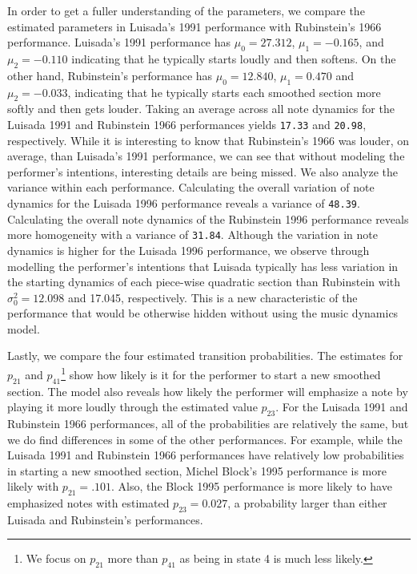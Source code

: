 \documentclass[12pt]{article}
\begin{document}
In order to get a fuller understanding of the parameters, we compare the
estimated parameters in Luisada's 1991 performance with Rubinstein's
1966 performance. Luisada's 1991 performance has \(\mu_0 = 27.312\),
\(\mu_1=-0.165\), and \(\mu_2=-0.110\) indicating that he typically
starts loudly and then softens. On the other hand, Rubinstein's
performance has \(\mu_0 = 12.840\), \(\mu_1=0.470\) and
\(\mu_2=-0.033\), indicating that he typically starts each smoothed
section more softly and then gets louder. Taking an average across all
note dynamics for the Luisada 1991 and Rubinstein 1966 performances
yields \texttt{17.33} and \texttt{20.98}, respectively. While it is
interesting to know that Rubinstein's 1966 was louder, on average, than
Luisada's 1991 performance, we can see that without modeling the
performer's intentions, interesting details are being missed. We also
analyze the variance within each performance. Calculating the overall
variation of note dynamics for the Luisada 1996 performance reveals a
variance of \texttt{48.39}. Calculating the overall note dynamics of the
Rubinstein 1996 performance reveals more homogeneity with a variance of
\texttt{31.84}. Although the variation in note dynamics is higher for
the Luisada 1996 performance, we observe through modelling the
performer's intentions that Luisada typically has less variation in the
starting dynamics of each piece-wise quadratic section than Rubinstein
with \(\sigma^2_0=12.098\) and 17.045, respectively. This is a new
characteristic of the performance that would be otherwise hidden without
using the music dynamics model.

Lastly, we compare the four estimated transition probabilities. The
estimates for \(p_{21}\) and
\(p_{41}\)\footnote{We focus on $p_{21}$ more than $p_{41}$ as being in state 4 is much less likely. }
show how likely is it for the performer to start a new smoothed section.
The model also reveals how likely the performer will emphasize a note by
playing it more loudly through the estimated value \(p_{23}\). For the
Luisada 1991 and Rubinstein 1966 performances, all of the probabilities
are relatively the same, but we do find differences in some of the other
performances. For example, while the Luisada 1991 and Rubinstein 1966
performances have relatively low probabilities in starting a new
smoothed section, Michel Block's 1995 performance is more likely with
\(p_{21}=.101\). Also, the Block 1995 performance is more likely to have
emphasized notes with estimated \(p_{23}=0.027\), a probability larger
than either Luisada and Rubinstein's performances.
\end{document}
